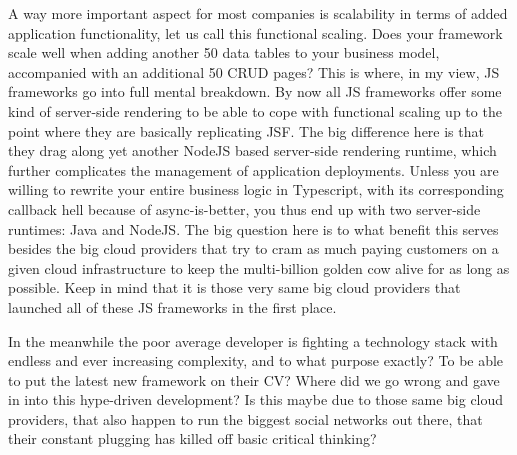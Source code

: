 A way more important aspect for most companies is scalability in terms of added application functionality, let us call this functional scaling.
Does your framework scale well when adding another 50 data tables to your business model, accompanied with an additional 50 CRUD pages?
This is where, in my view, JS frameworks go into full mental breakdown.
By now all JS frameworks offer some kind of server-side rendering to be able to cope with functional scaling up to the point where they are basically replicating JSF.
The big difference here is that they drag along yet another NodeJS based server-side rendering runtime, which further complicates the management of application deployments.
Unless you are willing to rewrite your entire business logic in Typescript, with its corresponding callback hell because of async-is-better, you thus end up with two server-side runtimes: Java and NodeJS.
The big question here is to what benefit this serves besides the big cloud providers that try to cram as much paying customers on a given cloud infrastructure to keep the multi-billion golden cow alive for as long as possible.
Keep in mind that it is those very same big cloud providers that launched all of these JS frameworks in the first place.

In the meanwhile the poor average developer is fighting a technology stack with endless and ever increasing complexity, and to what purpose exactly?
To be able to put the latest new framework on their CV?
Where did we go wrong and gave in into this hype-driven development?
Is this maybe due to those same big cloud providers, that also happen to run the biggest social networks out there, that their constant plugging has killed off basic critical thinking?